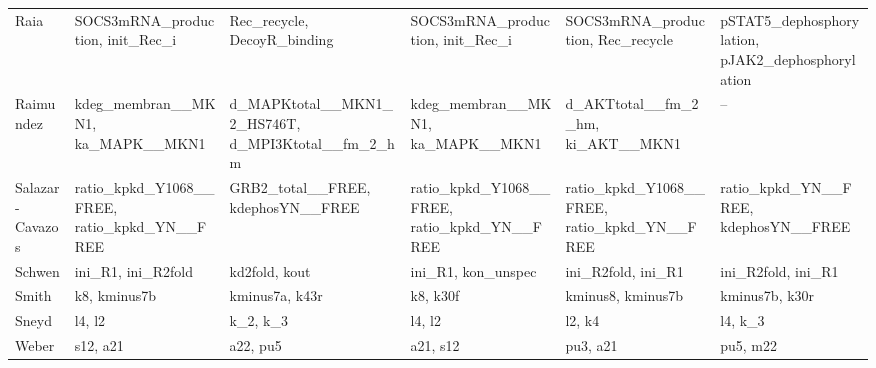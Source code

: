 \begin{longtable}{@{}l>{\raggedright}p{2.6cm}>{\raggedright}p{2.6cm}>{\raggedright}p{2.6cm}>{\raggedright}p{2.6cm}>{\raggedright\arraybackslash}p{2.6cm}@{}}
Raia & SOCS3mRNA\_\allowbreak{}production, init\_\allowbreak{}Rec\_\allowbreak{}i & Rec\_\allowbreak{}recycle, DecoyR\_\allowbreak{}binding & SOCS3mRNA\_\allowbreak{}production, init\_\allowbreak{}Rec\_\allowbreak{}i & SOCS3mRNA\_\allowbreak{}production, Rec\_\allowbreak{}recycle & pSTAT5\_\allowbreak{}dephosphorylation, pJAK2\_\allowbreak{}dephosphorylation \\
Raimundez & kdeg\_\allowbreak{}membran\_\allowbreak{}\_\allowbreak{}MKN1, ka\_\allowbreak{}MAPK\_\allowbreak{}\_\allowbreak{}MKN1 & d\_\allowbreak{}MAPKtotal\_\allowbreak{}\_\allowbreak{}MKN1\_\allowbreak{}2\_\allowbreak{}HS746T, d\_\allowbreak{}MPI3Ktotal\_\allowbreak{}\_\allowbreak{}fm\_\allowbreak{}2\_\allowbreak{}hm & kdeg\_\allowbreak{}membran\_\allowbreak{}\_\allowbreak{}MKN1, ka\_\allowbreak{}MAPK\_\allowbreak{}\_\allowbreak{}MKN1 & d\_\allowbreak{}AKTtotal\_\allowbreak{}\_\allowbreak{}fm\_\allowbreak{}2\_\allowbreak{}hm, ki\_\allowbreak{}AKT\_\allowbreak{}\_\allowbreak{}MKN1 & -- \\
Salazar-Cavazos & ratio\_\allowbreak{}kpkd\_\allowbreak{}Y1068\_\allowbreak{}\_\allowbreak{}FREE, ratio\_\allowbreak{}kpkd\_\allowbreak{}YN\_\allowbreak{}\_\allowbreak{}FREE & GRB2\_\allowbreak{}total\_\allowbreak{}\_\allowbreak{}FREE, kdephosYN\_\allowbreak{}\_\allowbreak{}FREE & ratio\_\allowbreak{}kpkd\_\allowbreak{}Y1068\_\allowbreak{}\_\allowbreak{}FREE, ratio\_\allowbreak{}kpkd\_\allowbreak{}YN\_\allowbreak{}\_\allowbreak{}FREE & ratio\_\allowbreak{}kpkd\_\allowbreak{}Y1068\_\allowbreak{}\_\allowbreak{}FREE, ratio\_\allowbreak{}kpkd\_\allowbreak{}YN\_\allowbreak{}\_\allowbreak{}FREE & ratio\_\allowbreak{}kpkd\_\allowbreak{}YN\_\allowbreak{}\_\allowbreak{}FREE, kdephosYN\_\allowbreak{}\_\allowbreak{}FREE \\
Schwen & ini\_\allowbreak{}R1, ini\_\allowbreak{}R2fold & kd2fold, kout & ini\_\allowbreak{}R1, kon\_\allowbreak{}unspec & ini\_\allowbreak{}R2fold, ini\_\allowbreak{}R1 & ini\_\allowbreak{}R2fold, ini\_\allowbreak{}R1 \\
Smith & k8, kminus7b & kminus7a, k43r & k8, k30f & kminus8, kminus7b & kminus7b, k30r \\
Sneyd & l4, l2 & k\_\allowbreak{}2, k\_\allowbreak{}3 & l4, l2 & l2, k4 & l4, k\_\allowbreak{}3 \\
Weber & s12, a21 & a22, pu5 & a21, s12 & pu3, a21 & pu5, m22 \\

\end{longtable}
